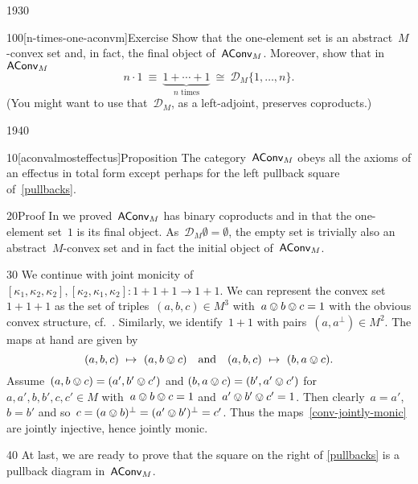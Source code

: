 \begin{parsec}{1930}
\begin{point}{100}[n-times-one-aconvm]{Exercise}
Show that the one-element set is an abstract~$M$-convex set
    and, in fact, the final object of~$\mathsf{AConv}_M$.
Moreover, show that in~$\mathsf{AConv}_M$
\begin{equation*}
    n \cdot 1 \ \equiv \ \underbrace{1 + \cdots + 1}_{\text{$n$ times}}
    \ \cong \ \mathcal{D}_M \{1, \ldots, n\}.
\end{equation*}
(You might want to use that~$\mathcal{D}_M$, as a left-adjoint,
    preserves coproducts.)
\end{point}
\end{parsec}

\begin{parsec}{1940}%
\begin{point}{10}[aconvalmosteffectus]{Proposition}%
The category~$\mathsf{AConv}_M$ obeys all the axioms of an effectus in total
form except perhaps for the left pullback square of~\eqref{pullbacks}.
\begin{point}{20}{Proof}%
In  we proved~$\mathsf{AConv}_M$ has binary coproducts
    and in 
    that the one-element set~$1$ is its final object.
As~$\mathcal{D}_M \emptyset = \emptyset$,
    the empty set is trivially also an abstract~$M$-convex set
    and in fact the initial object of~$\mathsf{AConv}_M$.
\end{point}
\begin{point}{30}%
We continue with joint monicity
    of~$[\kappa_1,\kappa_2,\kappa_2],
    [\kappa_2,\kappa_1,\kappa_2]\colon 1+1+1 \to 1+1$.
We can represent the convex set~$1+1+1$
    as the set of triples~$(a,b,c) \in M^3$
    with~$a\ovee b \ovee c = 1$
    with the obvious convex structure,
    cf.~.
Similarly, we identify~$1+1$
    with pairs~$(a,a^\perp) \in M^2$.
    The maps at hand are given by
\begin{equation}\label{conv-jointly-monic}
    (a,b,c) \ \mapsto\  (a , b\ovee c)\quad \text{and} \quad
    (a,b,c) \ \mapsto\  (b, a\ovee c).
\end{equation}
Assume~$
(a, b \ovee c) = 
(a', b' \ovee c') $
and
$(b, a \ovee c) = 
(b', a' \ovee c') $
for~$a,a',b,b',c,c' \in M$ with~$a \ovee b \ovee c= 1$
and~$a' \ovee b' \ovee c'= 1$.
Then clearly~$a=a'$,~$b=b'$
    and so~$c = (a\ovee b)^\perp = (a' \ovee b')^\perp = c'$.
Thus the maps~\eqref{conv-jointly-monic} are jointly injective,
    hence jointly monic.
\end{point}
\begin{point}{40}%
At last, we are ready to prove that the square on the right of \eqref{pullbacks}
    is a pullback diagram in~$\mathsf{AConv}_M$.

\end{point}
\end{point}
\end{parsec}
